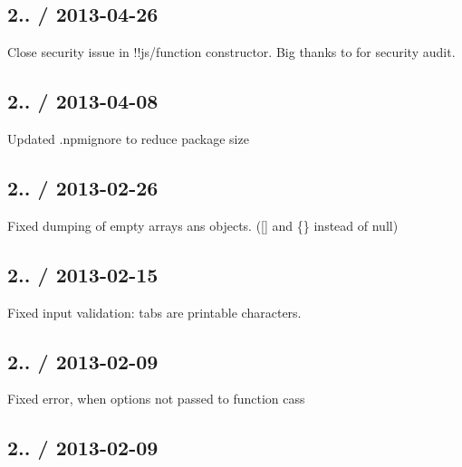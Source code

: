 \subsection*{2.. / 2013-\/04-\/26 }


\begin{DoxyItemize}
\item Close security issue in !!js/function constructor. Big thanks to  for security audit.
\end{DoxyItemize}

\subsection*{2.. / 2013-\/04-\/08 }


\begin{DoxyItemize}
\item Updated .npmignore to reduce package size
\end{DoxyItemize}

\subsection*{2.. / 2013-\/02-\/26 }


\begin{DoxyItemize}
\item Fixed dumping of empty arrays ans objects. (\mbox{[}\mbox{]} and \{\} instead of null)
\end{DoxyItemize}

\subsection*{2.. / 2013-\/02-\/15 }


\begin{DoxyItemize}
\item Fixed input validation\+: tabs are printable characters.
\end{DoxyItemize}

\subsection*{2.. / 2013-\/02-\/09 }


\begin{DoxyItemize}
\item Fixed error, when options not passed to function cass
\end{DoxyItemize}

\subsection*{2.. / 2013-\/02-\/09 }


